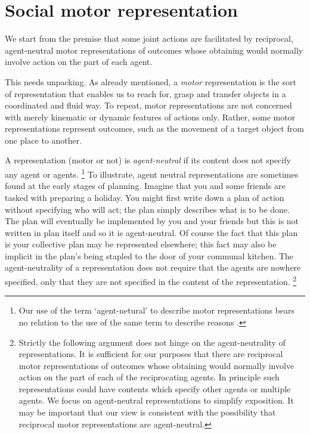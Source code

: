\documentclass[12pt,\papersize]{extarticle}
\begin{document}
\section{Social motor representation}
We start from the premise that some joint actions are facilitated by reciprocal, agent-neutral motor representations of outcomes whose obtaining would normally involve action on the part of each agent.

This needs unpacking. 
As already mentioned, a \textit{motor} representation is the sort of representation that enables us to reach for, grasp and transfer objects in a coordinated and fluid way.
To repeat, motor representations are not concerned with merely kinematic or dynamic features of actions only.
Rather, some motor representations represent outcomes, such as the movement of a target object from one place to another.

A representation (motor or not) is \emph{agent-neutral} if its content does not specify any agent or agents.%
\footnote{
Our use of the term `agent-netural' to describe motor representations bears no relation to the use of the same term  to describe reasons \citep[on the latter, see][]{Parfit:1984fk}.
}
To illustrate, agent neutral representations are sometimes found at the early stages of planning.
Imagine that you and some friends are tasked with preparing a holiday.  
You might first write down a plan of action without specifying who will act; the plan simply describes what is to be done.
The plan  will eventually be implemented by you and your friends
 but this is not written in plan itself  and so it is agent-neutral.
Of course the fact that this plan is your collective plan may be represented elsewhere; this fact may also be implicit in  the plan's being stapled to the door of your communal kitchen.
The agent-neutrality of a representation does not require that the agents are nowhere specified, only that they are not specified in the content of the representation.%
\footnote{
Strictly the following argument does not hinge on the agent-neutrality of representations.
It is sufficient for our purposes that there are reciprocal motor representations  of outcomes whose obtaining would normally involve action on the part of each of the reciprocating agents.
In principle such representations could have contents which specify other agents or multiple agents. 
We focus on agent-neutral representations to simplify exposition.
It may be important that our view is consistent with the possibility that reciprocal motor representations are agent-neutral. 
}
\end{document}
